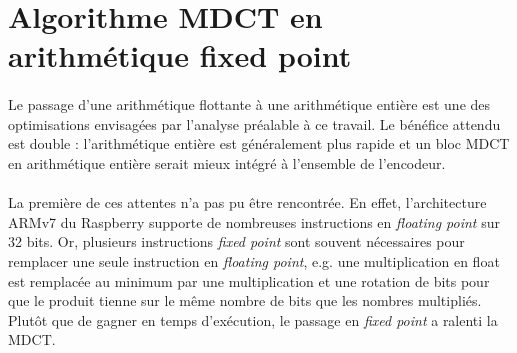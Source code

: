 \documentclass{article}
\begin{document}



    \newpage
    \section{Algorithme MDCT en arithmétique fixed point}
    \label{sec:fixed_point}
    \paragraph{}
    Le passage d'une arithmétique flottante à une arithmétique entière est une des optimisations envisagées par l'analyse préalable à ce travail. Le bénéfice attendu est double : l'arithmétique entière est généralement plus rapide et un bloc MDCT en arithmétique entière serait mieux intégré à l'ensemble de l'encodeur.

    \paragraph{}
    La première de ces attentes n'a pas pu être rencontrée. En effet, l'architecture ARMv7 du Raspberry supporte de nombreuses instructions en \emph{floating point} sur 32 bits\cite{DOC-ARM}. Or, plusieurs instructions \emph{fixed point} sont souvent nécessaires pour remplacer une seule instruction en \emph{floating point}, e.g. une multiplication en float est remplacée au minimum par une multiplication et une rotation de bits pour que le produit tienne sur le même nombre de bits que les nombres multipliés. Plutôt que de gagner en temps d'exécution, le passage en \emph{fixed point} a ralenti la MDCT.
\end{document}
